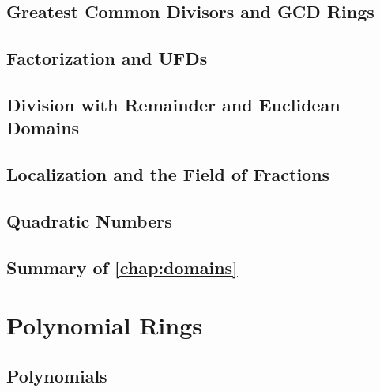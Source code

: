\documentclass{memoir}
\begin{document}
    \section{Greatest Common Divisors and GCD Rings}
      \label{sec:gcd-rings}
      
      \newpage

    \section{Factorization and UFDs}
      \label{sec:ufds}
      
      \newpage

    \section{Division with Remainder and Euclidean Domains}
      \label{sec:eds}
      
      \newpage

    \section{Localization and the Field of Fractions}
      \label{sec:localization}
      
      \newpage

    \section{Quadratic Numbers}
      \label{sec:quad-num}
      
      \newpage

    \section*{Summary of \autoref{chap:domains}}
      


  \chapter{Polynomial Rings}
    \label{chap:poly}
    
    \newpage

    \section{Polynomials}
      \label{sec:polynomials}
      
      \newpage
\end{document}

